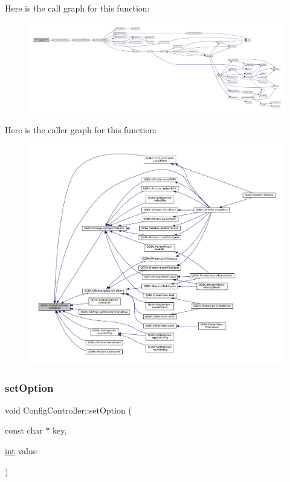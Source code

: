 Here is the call graph for this function\+:
\nopagebreak
\begin{figure}[H]
\begin{center}
\leavevmode
\includegraphics[width=350pt]{class_q_g_b_a_1_1_config_controller_ace91684a6678e30d8366fd7262c176dd_cgraph}
\end{center}
\end{figure}
Here is the caller graph for this function\+:
\nopagebreak
\begin{figure}[H]
\begin{center}
\leavevmode
\includegraphics[width=350pt]{class_q_g_b_a_1_1_config_controller_ace91684a6678e30d8366fd7262c176dd_icgraph}
\end{center}
\end{figure}
\mbox{\label{class_q_g_b_a_1_1_config_controller_a63c940b97dda27d822b7255f88e0691c}} 
\subsubsection{\texorpdfstring{set\+Option}{setOption}\hspace{0.1cm}{\footnotesize\ttfamily [2/5]}}
{\footnotesize\ttfamily void Config\+Controller\+::set\+Option (\begin{DoxyParamCaption}\item[{const char $\ast$}]{key,  }\item[{\mbox{\hyperlink{ioapi_8h_a787fa3cf048117ba7123753c1e74fcd6}{int}}}]{value }\end{DoxyParamCaption})\hspace{0.3cm}{\ttfamily [slot]}}

